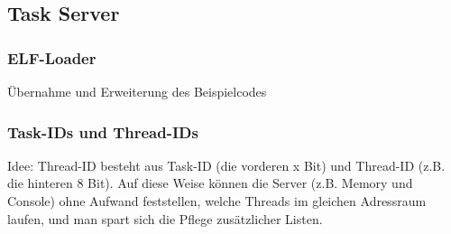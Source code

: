 \subsection{Task Server}

\subsubsection{ELF-Loader}

Übernahme und Erweiterung des Beispielcodes

\subsubsection{Task-IDs und Thread-IDs}

Idee: Thread-ID besteht aus Task-ID (die vorderen x Bit) und Thread-ID (z.B. die hinteren 8 Bit). Auf diese Weise können die Server (z.B. Memory und Console) ohne Aufwand feststellen, welche Threads im gleichen Adressraum laufen, und man spart sich die Pflege zusätzlicher Listen.
